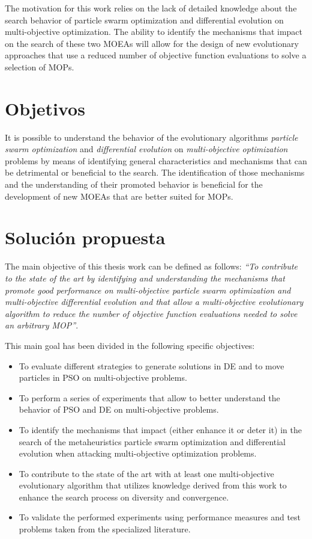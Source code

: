The motivation for this work relies on the lack of detailed knowledge about the search behavior of particle swarm optimization and differential evolution on multi-objective optimization. The ability to identify the mechanisms that impact on the search of these two MOEAs will allow for the design of new evolutionary approaches that use a reduced number of objective function evaluations to solve a selection of MOPs. 

\section{Objetivos}

It is possible to understand the behavior of the evolutionary algorithms \emph{particle swarm optimization} and \emph{differential evolution} on \emph{multi-objective optimization} problems  by means of identifying general characteristics and mechanisms that can be detrimental or beneficial to the search. The identification of those mechanisms and the understanding of their promoted behavior is beneficial for the development of new MOEAs that are better suited for MOPs. 

\section{Solución propuesta}

The main objective of this thesis work can be defined as follows: \emph{``To contribute to the state of the art by identifying and understanding the mechanisms that promote good performance on multi-objective particle swarm optimization and multi-objective differential evolution and that allow a multi-objective evolutionary algorithm to reduce the number of objective function evaluations needed to solve an arbitrary MOP''}. 

This main goal has been divided in the following specific objectives: 
\begin{itemize}\setlength{\itemsep}{-1mm}
	\item To evaluate different strategies to generate solutions in DE and to move particles in PSO on multi-objective problems.
	\item To perform a series of experiments that allow to better understand the behavior of PSO and DE on multi-objective problems.
	\item To identify the mechanisms that impact (either enhance it or deter it) in the search of the metaheuristics particle swarm optimization and differential evolution when attacking multi-objective optimization problems. 
	\item To contribute to the state of the art with at least one multi-objective evolutionary algorithm that utilizes knowledge derived from this work to enhance the search process on diversity and convergence. 
	\item To validate the performed experiments using performance measures and test problems taken from the specialized literature.
\end{itemize}


